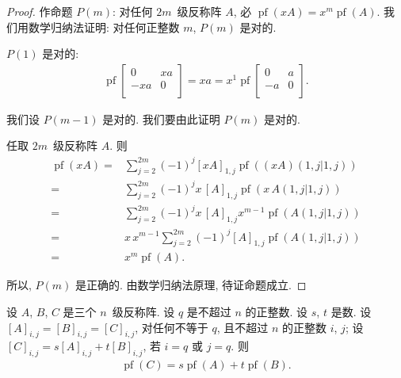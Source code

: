 \begin{proof}
    作命题 \(P(m)\):
    对任何 \(2m\)~级反称阵 \(A\),
    必 \(\operatorname{pf} {(xA)}
    = x^m \operatorname{pf} {(A)}\).
    我们用数学归纳法证明:
    对任何正整数 \(m\), \(P(m)\) 是对的.

    \(P(1)\) 是对的:
    \begin{align*}
        \operatorname{pf} {
            \begin{bmatrix}
                0   & xa \\
                -xa & 0  \\
            \end{bmatrix}
        }
        = xa
        = x^1 \operatorname{pf} {
            \begin{bmatrix}
                0  & a \\
                -a & 0 \\
            \end{bmatrix}
        }.
    \end{align*}

    我们设 \(P(m-1)\) 是对的.
    我们要由此证明 \(P(m)\) 是对的.

    任取 \(2m\)~级反称阵 \(A\).
    则
    \begin{align*}
        \operatorname{pf} {(xA)}
        = {} &
        \sum_{j = 2}^{2m}
        {(-1)^{j} [xA]_{1,j}
        \operatorname{pf} {((xA)({1,j}|{1,j}))}}
        \\
        = {} &
        \sum_{j = 2}^{2m}
        {(-1)^{j} x\, [A]_{1,j}
        \operatorname{pf} {(x\,A({1,j}|{1,j}))}}
        \\
        = {} &
        \sum_{j = 2}^{2m}
        {(-1)^{j} x\, [A]_{1,j}
        x^{m-1} \operatorname{pf} {(A({1,j}|{1,j}))}}
        \\
        = {} &
        x\,x^{m-1}
        \sum_{j = 2}^{2m}
        {(-1)^{j} [A]_{1,j}
        \operatorname{pf} {(A({1,j}|{1,j}))}}
        \\
        = {} &
        x^m \operatorname{pf} {(A)}.
    \end{align*}

    所以, \(P(m)\) 是正确的.
    由数学归纳法原理, 待证命题成立.
\end{proof}

\begin{theorem}
    设 \(A\), \(B\), \(C\) 是三个 \(n\)~级反称阵.
    设 \(q\) 是不超过 \(n\) 的正整数.
    设 \(s\), \(t\) 是数.
    设 \([A]_{i,j} = [B]_{i,j} = [C]_{i,j}\),
    对任何不等于 \(q\), 且不超过 \(n\) 的正整数 \(i\), \(j\);
    设 \([C]_{i,j} = s[A]_{i,j} + t[B]_{i,j}\),
    若 \(i = q\) 或 \(j = q\).
    则
    \begin{align*}
        \operatorname{pf} {(C)}
        = s \operatorname{pf} {(A)}
        + t \operatorname{pf} {(B)}.
    \end{align*}
\end{theorem}


